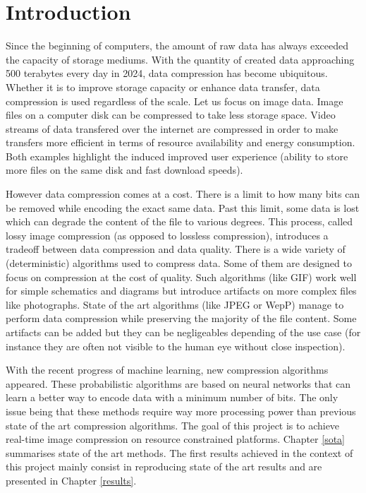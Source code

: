 \chapter*{Introduction}
Since the beginning of computers, the amount of raw data has always exceeded the capacity of storage mediums. With the quantity of created data approaching 500 terabytes every day in 2024, data compression has become ubiquitous. Whether it is to improve storage capacity or enhance data transfer, data compression is used regardless of the scale. Let us focus on image data. Image files on a computer disk can be compressed to take less storage space. Video streams of data transfered over the internet are compressed in order to make transfers more efficient in terms of resource availability and energy consumption. Both examples highlight the induced improved user experience (ability to store more files on the same disk and fast download speeds).

However data compression comes at a cost. There is a limit to how many bits can be removed while encoding the exact same data. Past this limit, some data is lost which can degrade the content of the file to various degrees. This process, called lossy image compression (as opposed to lossless compression), introduces a tradeoff between data compression and data quality. There is a wide variety of (deterministic) algorithms used to compress data. Some of them are designed to focus on compression at the cost of quality. Such algorithms (like GIF) work well for simple schematics and diagrams but introduce artifacts on more complex files like photographs. State of the art algorithms (like JPEG or WepP) manage to perform data compression while preserving the majority of the file content. Some artifacts can be added but they can be negligeables depending of the use case (for instance they are often not visible to the human eye without close inspection).

With the recent progress of machine learning, new compression algorithms appeared. These probabilistic algorithms are based on neural networks that can learn a better way to encode data with a minimum number of bits. The only issue being that these methods require way more processing power than previous state of the art compression algorithms. The goal of this project is to achieve real-time image compression on resource constrained platforms. Chapter \ref{sota} summarises state of the art methods. The first results achieved in the context of this project mainly consist in reproducing state of the art results and are presented in Chapter \ref{results}.
